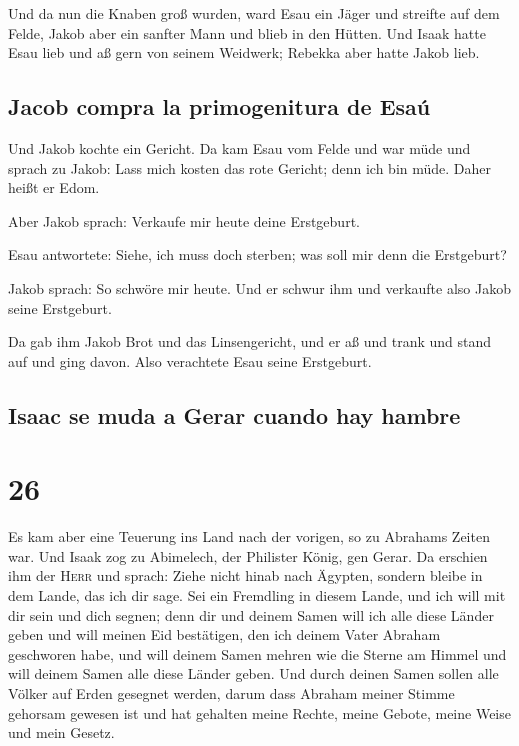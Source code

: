  Und da nun die Knaben groß wurden, ward Esau ein Jäger
und streifte auf dem Felde, Jakob aber ein sanfter Mann und blieb in den
Hütten.  Und Isaak hatte Esau lieb und aß gern von seinem
Weidwerk; Rebekka aber hatte Jakob lieb.

\hypertarget{jacob-compra-la-primogenitura-de-esauxfa}{%
\subsection{Jacob compra la primogenitura de
Esaú}\label{jacob-compra-la-primogenitura-de-esauxfa}}

 Und Jakob kochte ein Gericht. Da kam Esau vom Felde und
war müde  und sprach zu Jakob: Lass mich kosten das rote
Gericht; denn ich bin müde. Daher heißt er Edom.

 Aber Jakob sprach: Verkaufe mir heute deine Erstgeburt.

 Esau antwortete: Siehe, ich muss doch sterben; was soll
mir denn die Erstgeburt?

 Jakob sprach: So schwöre mir heute. Und er schwur ihm
und verkaufte also Jakob seine Erstgeburt.

 Da gab ihm Jakob Brot und das Linsengericht, und er aß
und trank und stand auf und ging davon. Also verachtete Esau seine
Erstgeburt.

\hypertarget{isaac-se-muda-a-gerar-cuando-hay-hambre}{%
\subsection{Isaac se muda a Gerar cuando hay
hambre}\label{isaac-se-muda-a-gerar-cuando-hay-hambre}}

\hypertarget{section-25}{%
\section{26}\label{section-25}}

 Es kam aber eine Teuerung ins Land nach der vorigen, so
zu Abrahams Zeiten war. Und Isaak zog zu Abimelech, der Philister König,
gen Gerar.  Da erschien ihm der \textsc{Herr} und sprach:
Ziehe nicht hinab nach Ägypten, sondern bleibe in dem Lande, das ich dir
sage.  Sei ein Fremdling in diesem Lande, und ich will mit
dir sein und dich segnen; denn dir und deinem Samen will ich alle diese
Länder geben und will meinen Eid bestätigen, den ich deinem Vater
Abraham geschworen habe,  und will deinem Samen mehren wie
die Sterne am Himmel und will deinem Samen alle diese Länder geben. Und
durch deinen Samen sollen alle Völker auf Erden gesegnet werden,
 darum dass Abraham meiner Stimme gehorsam gewesen ist und
hat gehalten meine Rechte, meine Gebote, meine Weise und mein Gesetz.

